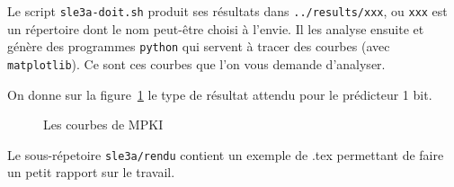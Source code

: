 \documentclass[a4paper]{article}
\begin{document}
Le script \verb+sle3a-doit.sh+ produit ses résultats dans \verb+../results/xxx+, ou \verb+xxx+ est un répertoire dont le nom peut-être choisi à l'envie.
Il les analyse ensuite et génère des programmes \texttt{python} qui servent à tracer des courbes (avec \texttt{matplotlib}).
Ce sont ces courbes que l'on vous demande d'analyser.

On donne sur la figure~\ref{results} le type de résultat attendu pour le prédicteur 1 bit.

      \begin{figure}[htb]
      \centering
      \caption{\label{results}Les courbes de MPKI}
      \end{figure}

Le sous-répetoire \verb+sle3a/rendu+ contient un exemple de .tex permettant de faire un petit rapport sur le travail.
\end{document}
